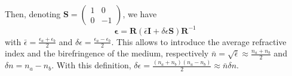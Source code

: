 Then, denoting $\mathbf{S}=\begin{pmatrix}1 & 0\\0&-1\end{pmatrix}$, we have 
\begin{equation}
	\bm{\epsilon} = \bm{R}\left(\bar{\epsilon}\mathbf{I} + \delta\epsilon \mathbf{S}\right)\bm{R}^{-1} \label{eq:espilon_decomp}
\end{equation}
with $\bar{\epsilon}=\frac{\epsilon_a+\epsilon_b}{2}$ and $\delta\epsilon=\frac{\epsilon_a-\epsilon_b}{2}$. This allows to introduce the average refractive index and the birefringence of the medium, respectively $\bar{n} = \sqrt{\bar{\epsilon}} \approx \frac{n_a+n_b}{2}$ and $\delta n = n_a - n_b$. With this definition, $\delta\epsilon = \frac{(n_a + n_b)(n_a - n_b)}{2} \approx \bar{n}\delta n$. 

